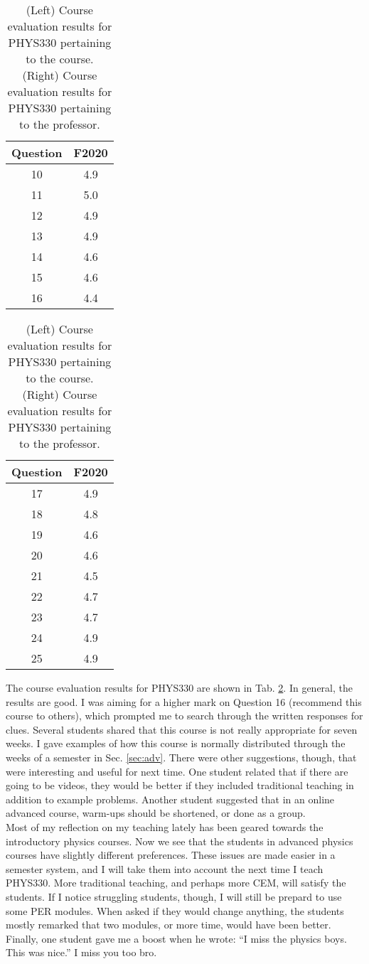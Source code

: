 \documentclass[../../main.tex]{subfiles}
\begin{document}
\begin{table}
\footnotesize
\centering
\begin{tabular}{| c | c |}
\hline
\hline
Question & F2020 \\ \hline
10 & 4.9 \\ \hline
11 & 5.0 \\ \hline
12 & 4.9 \\ \hline
13 & 4.9 \\ \hline
14 & 4.6 \\ \hline
15 & 4.6 \\ \hline
16 & 4.4 \\ \hline
\hline
\end{tabular}
\begin{tabular}{| c | c |}
\hline
\hline
Question & F2020 \\ \hline
17 & 4.9 \\ \hline
18 & 4.8 \\ \hline
19 & 4.6 \\ \hline
20 & 4.6 \\ \hline
21 & 4.5 \\ \hline
22 & 4.7 \\ \hline
23 & 4.7 \\ \hline
24 & 4.9 \\ \hline
25 & 4.9 \\ \hline
\hline
\end{tabular}
\caption{\label{tab:eval_330} (Left) Course evaluation results for PHYS330 pertaining to the course.  (Right) Course evaluation results for PHYS330 pertaining to the professor.}
\end{table}

The course evaluation results for PHYS330 are shown in Tab. \ref{tab:eval_330}.  In general, the results are good.  I was aiming for a higher mark on Question 16 (recommend this course to others), which prompted me to search through the written responses for clues. Several students shared that this course is not really appropriate for seven weeks.  I gave examples of how this course is normally distributed through the weeks of a semester in Sec. \ref{sec:adv}.  There were other suggestions, though, that were interesting and useful for next time.  One student related that if there are going to be videos, they would be better if they included traditional teaching in addition to example problems.  Another student suggested that in an online advanced course, warm-ups should be shortened, or done as a group.
\\
\vspace{0.25cm}
Most of my reflection on my teaching lately has been geared towards the introductory physics courses.  Now we see that the students in advanced physics courses have slightly different preferences.  These issues are made easier in a semester system, and I will take them into account the next time I teach PHYS330.  More traditional teaching, and perhaps more CEM, will satisfy the students.  If I notice struggling students, though, I will still be prepard to use some PER modules.  When asked if they would change anything, the students mostly remarked that two modules, or more time, would have been better.  Finally, one student gave me a boost when he wrote: ``I miss the physics boys.  This was nice.''  I miss you too bro.
\end{document}
